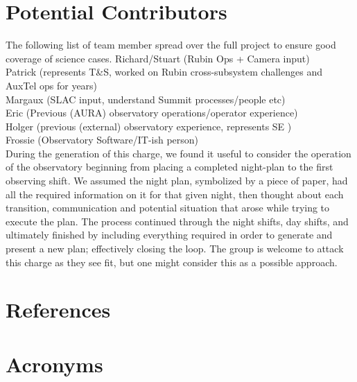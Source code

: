 \documentclass[SE,authoryear,toc]{lsstdoc}
\begin{document}
\section{Potential Contributors}
The following list of team member spread over the full project to ensure good coverage of science cases. 
Richard/Stuart (Rubin Ops + Camera input)\\
Patrick (represents T\&S, worked on Rubin cross-subsystem challenges and AuxTel ops for years)\\
Margaux (SLAC input, understand Summit processes/people etc)\\
Eric (Previous (AURA) observatory operations/operator experience)\\
Holger (previous (external) observatory experience, represents SE )\\
Frossie (Observatory Software/IT-ish person)\\

During the generation of this charge, we found it useful to consider the operation of the observatory beginning from placing a completed night-plan to the first observing shift. We assumed the night plan, symbolized by a piece of paper, had all the required information on it for that given night, then thought about each transition, communication and potential situation that arose while trying to execute the plan. The process continued through the night shifts, day shifts, and ultimately finished by including everything required in order to generate and present a new plan; effectively closing the loop. The group is welcome to attack this charge as they see fit, but one might consider this as a possible approach.



\appendix
\section{References} \label{sec:bib}
\renewcommand{\refname}{} %


\section{Acronyms} \label{sec:acronyms}

\end{document}
